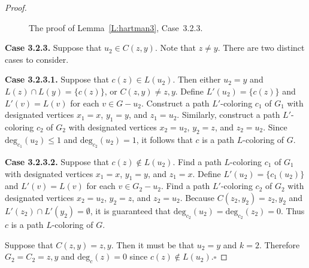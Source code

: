 \documentclass[12pt,letterpaper]{article}
\theoremstyle{plain}
\theoremstyle{definition}
\theoremstyle{break}
\newcommand{\ggcqedsymbol}{$\square$}
\newcommand{\ggcqed}{\hbox{}\nobreak\hbox{\quad\ggcqedsymbol}}
\newcommand{\ggcnopf}{\ggcqed}
\begin{document}
\begin{proof}
\begin{figure}[ht]
\begin{center}
    \caption{The proof of Lemma~\ref{L:hartman3}, Case~3.2.3.}
\end{center}
\end{figure}

\textbf{Case 3.2.3.}
Suppose that $u_2\in C(z,y)$. Note that $z\ne y$. There are two distinct cases to consider.

\textbf{Case 3.2.3.1.} Suppose that $c(z)\in L(u_2)$. Then 
either $u_2=y$ and $L(z)\cap L(y)=\{c(z)\}$, or $C(z,y)\ne z,y$.
Define $L'(u_2)=\{c(z)\}$
and $L'(v)=L(v)$ for each $v\in G-u_2$. Construct a path $L'$-coloring $c_1$ of $G_1$
with designated vertices $x_1=x$,
$y_1=y$, and $z_1=u_2$. Similarly, construct a path $L'$-coloring $c_2$ of
$G_2$ with designated vertices $x_2=u_2$, $y_2=z$, and $z_2=u_2$. Since
$\text{deg}_{c_1}(u_2)\le 1$ and $\text{deg}_{c_2}(u_2)=1$, it follows
that $c$ is a path $L$-coloring of $G$.

\textbf{Case 3.2.3.2.} Suppose that $c(z)\not\in L(u_2)$. Find a path $L$-coloring
$c_1$ of $G_1$ with designated vertices
$x_1=x$, $y_1=y$, and $z_1=x$. Define $L'(u_2)=\{c_1(u_2)\}$ and $L'(v)=L(v)$
for each $v\in G_2-u_2$. Find a path $L'$-coloring $c_2$ of $G_2$
with designated vertices $x_2=u_2$, $y_2=z$, and $z_2=u_2$. Because
$C(z_2,y_2)=z_2,y_2$ and $L'(z_2)\cap L'(y_2)=\emptyset$, it is
guaranteed that $\text{deg}_{c_2}(u_2)=\text{deg}_{c_2}(z_2)=0$. Thus
$c$ is a path $L$-coloring of $G$.

Suppose that $C(z,y)=z,y$. Then it must be that $u_2=y$ and $k=2$.
Therefore $G_2=C_2=z,y$ and $\text{deg}_c(z)=0$ since $c(z)\not\in L(u_2)$.\ggcnopf
\end{proof}
\end{document}
